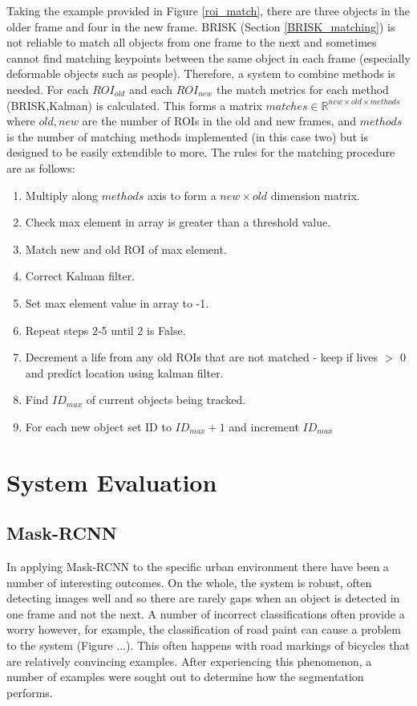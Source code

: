 \documentclass[a4paper,11pt,notitlepage]{article}
\begin{document}
Taking the example provided in Figure \ref{roi_match}, there are three objects in the older frame and four in the new frame. BRISK (Section \ref{BRISK_matching}) is not reliable to match all objects from one frame to the next and sometimes cannot find matching keypoints between the same object in each frame (especially deformable objects such as people). Therefore, a system to combine methods is needed. For each $ROI_{old}$ and each $ROI_{new}$ the match metrics for each method (BRISK,Kalman) is calculated. This forms a matrix $matches \in \mathbb{R}^{new \times old \times methods}$ where $old,new$ are the number of ROIs in the old and new frames, and 
$methods$ is the number of matching methods implemented (in this case two) but is designed to be easily extendible to more. The rules for the matching procedure are as follows:

\begin{enumerate}
	\item Multiply along $methods$ axis to form a $new \times old$ dimension matrix.
	\item Check max element in array is greater than a threshold value.
	\item Match new and old ROI of max element.
	\item Correct Kalman filter.
	\item Set max element value in array to -1.
	\item Repeat steps 2-5 until 2 is False.
	\item Decrement a life from any old ROIs that are not matched - keep if lives $>$ 0 and predict location using kalman filter.
	\item Find $ID_{max}$ of current objects being tracked.
	\item For each new object set ID to $ID_{max}+1$ and increment $ID_{max}$
\end{enumerate}


\section{System Evaluation}

\subsection{Mask-RCNN}
In applying Mask-RCNN to the specific urban environment there have been a number of interesting outcomes. On the whole, the system is robust, often detecting images well and so there are rarely gaps when an object is detected in one frame and not the next. A number of incorrect classifications often provide a worry however, for example, the classification of road paint can cause a problem to the system (Figure ...). This often happens with road markings of bicycles that are relatively convincing examples. After experiencing this phenomenon, a number of examples were sought out to determine how the segmentation performs.
\end{document}
